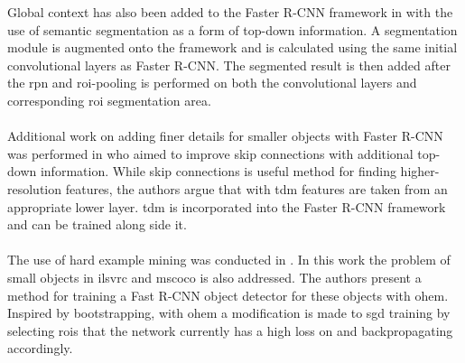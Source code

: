 Global context has also been added to the Faster R-CNN framework in \cite{contextprim} with the use of semantic segmentation as a form of top-down information. A segmentation module is augmented onto the framework and is calculated using the same initial convolutional layers as Faster R-CNN. The segmented result is then added after the \gls{rpn} and \gls{roi}-pooling is performed on both the convolutional layers and corresponding \gls{roi} segmentation area.
\\\\
Additional work on adding finer details for smaller objects with Faster R-CNN was performed in \cite{beyondskip} who aimed to improve skip connections with additional top-down information. While skip connections is useful method for finding higher-resolution features, the authors argue that with \gls{tdm} features are taken from an appropriate lower layer. \gls{tdm} is incorporated into the Faster R-CNN framework and can be trained along side it. 
\\\\
The use of hard example mining was conducted in \cite{ohem}. In this work the problem of small objects in \gls{ilsvrc} and \gls{mscoco} is also addressed. The authors present a method for training a Fast R-CNN object detector for these objects with \gls{ohem}. Inspired by bootstrapping, with \gls{ohem} a modification is made to \gls{sgd} training by selecting \glspl{roi} that the network currently has a high loss on and backpropagating accordingly. 
\\\\
